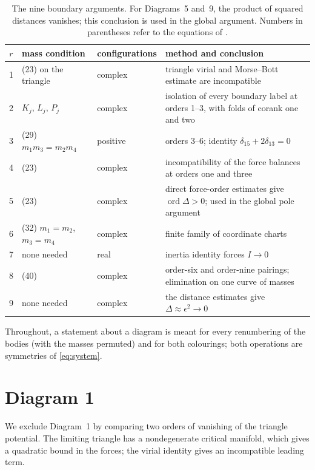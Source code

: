 \documentclass[Threeside,11pt]{article}
\theoremstyle{definition}
\theoremstyle{remark}
\numberwithin{equation}{section}
\theoremstyle{remark}
\newcommand{\ord}{\operatorname{ord}}
\begin{document}
{\begin{table}[ht]
\centering
\small
\begin{tabular}{cllp{5.4cm}}
\hline
$r$ & mass condition & configurations & method and conclusion \\
\hline
1 & (23) on the triangle & complex & triangle virial and Morse--Bott estimate are incompatible \\
2 & $K_j$, $L_j$, $P_j$ & complex & isolation of every boundary label at orders 1--3,
with folds of corank one and two \\
3 & (29) $m_1m_3=m_2m_4$ & positive & orders 3--6; identity $\delta_{15}+2\delta_{13}=0$ \\
4 & (23) & complex & incompatibility of the force balances at orders one and three \\
5 & (23) & complex & direct force-order estimates give $\ord\Delta>0$; used in the global pole argument \\
6 & (32) $m_1=m_2$, $m_3=m_4$ & complex & finite family of coordinate charts \\
7 & none needed & real & inertia identity forces $I\to0$ \\
8 & (40) & complex & order-six and order-nine pairings; elimination on one curve of masses \\
9 & none needed & complex & the distance estimates give $\Delta\approx\epsilon^2\to0$ \\
\hline
\end{tabular}
\caption{The nine boundary arguments.  For Diagrams~5 and~9, the product of squared distances vanishes;
this conclusion is used in the global argument.  Numbers in parentheses refer to the equations of \cite[\S8]{AK}.}
\label{tab:exclusions}
\end{table}

}
Throughout, a statement about a diagram is meant for every renumbering of the bodies (with the
masses permuted) and for both colourings; both operations are symmetries of
\eqref{eq:system}.


\section{Diagram 1}\label{sec:d1}

We exclude Diagram~1 by comparing two orders of vanishing of the triangle potential.
The limiting triangle has a nondegenerate critical manifold, which gives a quadratic
bound in the forces; the virial identity gives an incompatible leading term.
\end{document}
